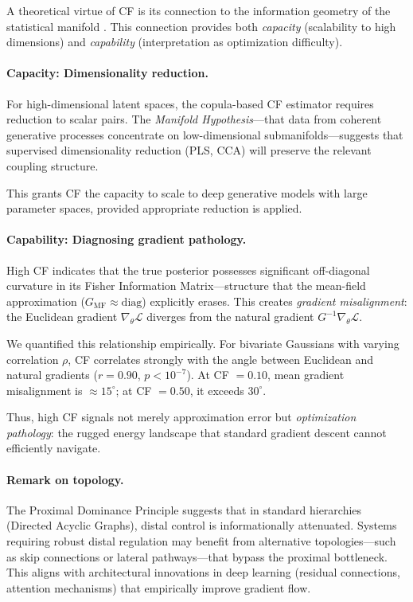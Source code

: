\documentclass[10pt]{article} %
\theoremstyle{plain}
\theoremstyle{definition}
\begin{document}
A theoretical virtue of CF is its connection to the information geometry of the statistical manifold \citep{amari2016information}. This connection provides both \emph{capacity} (scalability to high dimensions) and \emph{capability} (interpretation as optimization difficulty).

\paragraph{Capacity: Dimensionality reduction.} For high-dimensional latent spaces, the copula-based CF estimator requires reduction to scalar pairs. The \emph{Manifold Hypothesis}---that data from coherent generative processes concentrate on low-dimensional submanifolds---suggests that supervised dimensionality reduction (PLS, CCA) will preserve the relevant coupling structure.

This grants CF the capacity to scale to deep generative models with large parameter spaces, provided appropriate reduction is applied.

\paragraph{Capability: Diagnosing gradient pathology.} High CF indicates that the true posterior possesses significant off-diagonal curvature in its Fisher Information Matrix---structure that the mean-field approximation ($G_{\text{MF}} \approx \text{diag}$) explicitly erases. This creates \emph{gradient misalignment}: the Euclidean gradient $\nabla_\theta \mathcal{L}$ diverges from the natural gradient $G^{-1}\nabla_\theta \mathcal{L}$.

We quantified this relationship empirically. For bivariate Gaussians with varying correlation $\rho$, CF correlates strongly with the angle between Euclidean and natural gradients ($r = 0.90$, $p < 10^{-7}$). At CF $= 0.10$, mean gradient misalignment is $\approx 15^{\circ}$; at CF $= 0.50$, it exceeds $30^{\circ}$.

Thus, high CF signals not merely approximation error but \emph{optimization pathology}: the rugged energy landscape that standard gradient descent cannot efficiently navigate.

\paragraph{Remark on topology.} The Proximal Dominance Principle suggests that in standard hierarchies (Directed Acyclic Graphs), distal control is informationally attenuated. Systems requiring robust distal regulation may benefit from alternative topologies---such as skip connections or lateral pathways---that bypass the proximal bottleneck. This aligns with architectural innovations in deep learning (residual connections, attention mechanisms) that empirically improve gradient flow.
\end{document}
